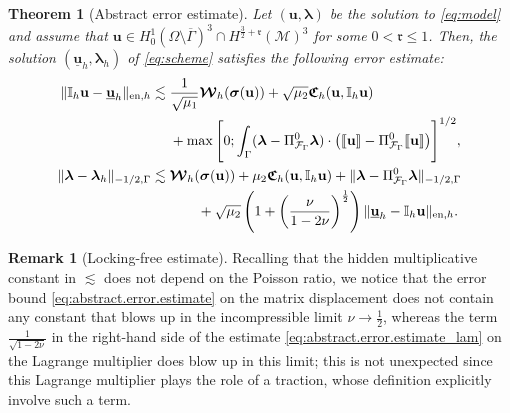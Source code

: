\documentclass[a4paper,11pt]{article}
\newtheorem{theorem}{Theorem}[section]
\theoremstyle{definition}
\newtheorem{remark}{Remark}[section]
\theoremstyle{remark}
\newcommand{\uvec}[1]{\underline{\mathbf{#1}}}
\newcommand{\bo}[1]{\mathbf{#1}}
\newcommand{\bos}[1]{\boldsymbol{#1}}
\newcommand{\mI}[1]{\mathbb I_h\bo{#1}}
\def\bsig{\boldsymbol{\sigma}}
\def\cF{\mathcal{F}}
\def\cM{\mathcal{M}}
\def\cW{\mathcal{W}}
\def\fr{\mathfrak{r}}
\def\fC{\mathfrak{C}}
\def\blambda{\boldsymbol{\lambda}}
\def\sjump#1{[\hskip -1.5pt[#1]\hskip -1.5pt]}
\def\O{\Omega}
\begin{document}
\begin{theorem}[Abstract error estimate]\label{thm:abstract.error.estimate}
Let $(\bo{u},\blambda)$ be the solution to \eqref{eq:model} and assume that $\bo{u}\in H^1_0(\O\setminus\overline{\Gamma})^3\cap H^{\frac{3}{2}+\fr}(\cM)^3$ for some $0<\fr\leq 1$. Then, the solution $(\uvec{u}_h,\blambda_h)$ of \eqref{eq:scheme} satisfies the following error estimate:
\begin{align}
  \lVert \mI{u}-\uvec{u}_h\rVert_{\mathrm{en},h}\lesssim{}& \frac{1}{\sqrt{\mu_{1}}} \bos{\cW}_h(\bsig(\bo{u}))+ \sqrt{\mu_{2}}\bos{\fC}_h(\bo{u},\mI{u})\notag\\
  &+\max\Bigg[0;\int_{\Gamma}(\blambda-\Pi^0_{{\cF}_\Gamma}\blambda)\cdot\big( \sjump{\bo{u}}-\Pi^0_{\cF_\Gamma}\sjump{\bo{u}}\big)\Bigg]^{1/2},\label{eq:abstract.error.estimate}\\
 \lVert \blambda-\blambda_h\rVert_{-1/2,\Gamma} \lesssim{}& \bos{\cW}_h(\bsig(\bo{u}))+\mu_{2}\bos{\fC}_h(\bo{u},\mI{u})+\lVert\blambda-\Pi^0_{\cF_\Gamma}\blambda\rVert_{-1/2,\Gamma}\notag{}\\&\qquad +\sqrt{\mu_{2}}\left(1+\left(\frac{\nu}{1-2\nu}\right)^{\frac{1}{2}}\right)\lVert\uvec{u}_h-\mI{u}\rVert_{\mathrm{en},h}.
 \label{eq:abstract.error.estimate_lam}
 \end{align}
\end{theorem}

\begin{remark}[Locking-free estimate]
Recalling that the hidden multiplicative constant in $\lesssim$ does not depend on the Poisson ratio, we notice that the error bound \eqref{eq:abstract.error.estimate} on the matrix displacement does not contain any constant that blows up in the incompressible limit $\nu\to \frac12$, whereas the term $\frac{1}{\sqrt{1-2\nu}}$ in the right-hand side of the estimate \eqref{eq:abstract.error.estimate_lam} on the Lagrange multiplier does blow up in this limit; this is not unexpected since this Lagrange multiplier plays the role of a traction, whose definition explicitly involve such a term.
\end{remark}
\end{document}
